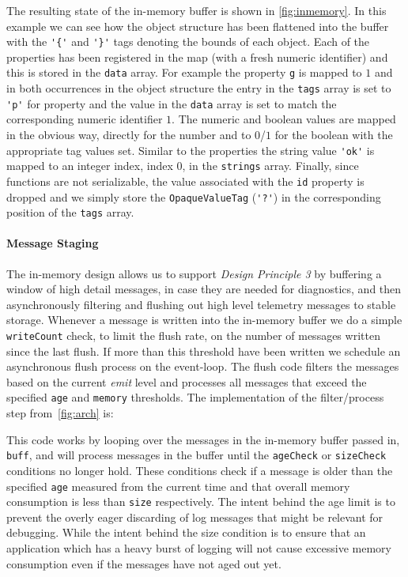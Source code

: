 The resulting state of the in-memory buffer is shown in \autoref{fig:inmemory}. 
In this example we can see how the object structure has been flattened into 
the buffer with the \lstinline!'{'! and \lstinline!'}'! tags denoting the bounds 
of each object. Each of the properties has been registered in the map (with a fresh 
numeric identifier) and this is stored in the \texttt{data} array. For example the 
property \lstinline!g! is mapped to $1$ and in both occurrences in the object 
structure the entry in the \texttt{tags} array is set to \lstinline!'p'! for 
property and the value in the \texttt{data} array is set to match the corresponding 
numeric identifier $1$. The numeric and boolean values are mapped in the obvious 
way, directly for the number and to $0$/$1$ for the boolean with the appropriate 
tag values set. Similar to the properties the string value \lstinline!'ok'! is 
mapped to an integer index, index $0$, in the \texttt{strings} array. Finally, 
since functions are not serializable, the value associated with the \lstinline!id! 
property is dropped and we simply store the \texttt{OpaqueValueTag} (\lstinline!'?'!) 
in the corresponding position of the \texttt{tags} array.

\paragraph{Message Staging}
\noindent
The in-memory design allows us to support \emph{Design Principle 3} by buffering a 
window of high detail messages, in case they are needed for diagnostics, and then 
asynchronously filtering and flushing out high level telemetry messages to stable 
storage. Whenever a message is written into the in-memory buffer we do a simple 
\texttt{writeCount} check, to limit the flush rate, on the number of messages written 
since the last flush. If more than this threshold have been written we schedule an 
asynchronous flush process on the event-loop. The flush code filters the messages 
based on the current \emph{emit} level and processes all messages that exceed the 
specified \texttt{age} and \texttt{memory} thresholds. The implementation of the 
filter/process step from~\autoref{fig:arch} is:



This code works by looping over the messages in the in-memory buffer passed in, 
\lstinline!buff!, and will process  messages in the buffer until the 
\lstinline!ageCheck! or \lstinline!sizeCheck! conditions no longer 
hold. These conditions check if a message is older than the specified 
\lstinline!age! measured from the current time and that overall memory 
consumption is less than \lstinline!size! respectively. The intent behind the 
age limit is to prevent the overly eager discarding of log messages that might 
be relevant for debugging. While the intent behind the size condition is to ensure 
that an application which has a heavy burst of logging will not cause excessive 
memory consumption even if the messages have not aged out yet.

